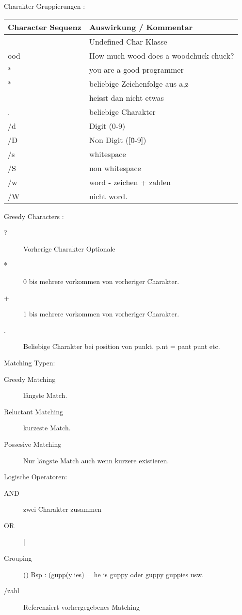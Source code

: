 \documentclass[a4paper,10pt]{scrreprt}
\begin{document}
Charakter Gruppierungen :
\begin{tabular}{|l|l|}
 \hline 
 \textbf{Character Sequenz} & \textbf{Auswirkung / Kommentar} \\ \hline
   [] & Undefined Char Klasse \\ \hline
   [wW]ood & How much wood does a woodchuck chuck? \\ \hline
   [abcd]* & you are a good programmer \\ \hline
   [a-zA-Z]* & beliebige Zeichenfolge aus a,z \\ \hline
   [\^(etwas)] & heisst dan nicht etwas \\ \hline
   . &  beliebige Charakter \\ \hline
   \slash d & Digit (0-9) \\ \hline
   \slash D & Non Digit ([\^0-9]) \\ \hline
   \slash s & whitespace \\ \hline
   \slash S & non whitespace \\ \hline 
   \slash w & word - zeichen + zahlen \\ \hline
   \slash W & nicht word. \\ \hline
\end{tabular}

Greedy Characters :
\begin{description}
 \item [?] Vorherige Charakter Optionale
 \item [*] 0 bis mehrere vorkommen von vorheriger Charakter.
 \item [+] 1 bis mehrere vorkommen von vorheriger Charakter.
 \item [.] Beliebige Charakter bei position von punkt. p.nt = pant punt etc.
 
\end{description}

Matching Typen:
\begin{description}
 \item [Greedy Matching] längste Match.
 \item [Reluctant Matching] kurzeste Match.
 \item [Possesive Matching] Nur längste Match auch wenn kurzere existieren.
 
\end{description}

Logische Operatoren:
\begin{description}
 \item [AND] zwei Charakter zusammen
 \item [OR] |
 \item [Grouping] () Bsp : (gupp(y|ies) = he is guppy oder guppy guppies usw.
 \item [\slash zahl] Referenziert vorhergegebenes Matching
  
\end{description}
\end{document}
